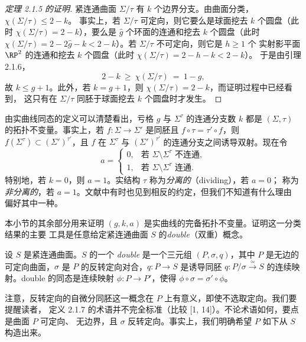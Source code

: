 \begin{proof}[定理 2.1.5 的证明]
紧连通曲面 $\Sigma/\tau$ 有 $k$ 个边界分支。由曲面分类，$\chi(\Sigma/\tau)\le2-k$。
事实上，若 $\Sigma/\tau$ 可定向，则它要么是球面挖去 $k$ 个圆盘（此时
$\chi(\Sigma/\tau)=2-k$），要么是 $\hat g$ 个环面的连通和挖去 $k$ 个圆盘（此时
$\chi(\Sigma/\tau)=2-2\hat g-k<2-k$）。若 $\Sigma/\tau$ 不可定向，则它是 $h\ge1$ 个
实射影平面 $\RP^2$ 的连通和挖去 $k$ 个圆盘（此时 $\chi(\Sigma/\tau)=2-h-k<2-k$）。
于是由引理 2.1.6，
\[
2-k\ \ge\ \chi(\Sigma/\tau)\ =\ 1-g,
\]
故 $k\le g+1$。此外，若 $k=g+1$，则 $\chi(\Sigma/\tau)=2-k$，而证明过程中已经看到，
这只有在 $\Sigma/\tau$ 同胚于球面挖去 $k$ 个圆盘时才发生。
\end{proof}

由实曲线同态的定义可以清楚看出，亏格 $g$ 与 $\Sigma^\tau$ 的连通分支数 $k$ 都是
$(\Sigma,\tau)$ 的拓扑不变量。事实上，若 $f:\Sigma\to\Sigma'$ 是同胚且
$f\circ\tau=\tau'\circ f$，则 $f(\Sigma^\tau)\subset(\Sigma')^{\tau'}$，且 $f$ 在
$\Sigma^\tau$ 与 $(\Sigma')^{\tau'}$ 的连通分支之间诱导双射。现在令
\begin{equation}\label{eq:2.4}
a=
\begin{cases}
0, & \text{若 } \Sigma\setminus\Sigma^\tau \text{ 不连通},\\
1, & \text{若 } \Sigma\setminus\Sigma^\tau \text{ 连通}.
\end{cases}
\end{equation}
特别地，若 $k=0$，则 $a=1$。实结构 $\tau$ 称为\emph{分离的}（dividing），若 $a=0$；
称为\emph{非分离的}，若 $a=1$。文献中有时也见到相反的约定，但我们不知道有什么理由
偏好其中一种。

本小节的其余部分用来证明 $(g,k,a)$ 是实曲线的完备拓扑不变量。证明这一分类结果的主要
工具是任意给定紧连通曲面 $S$ 的\emph{double}（双重）概念。

\begin{definition}\label{def:2.1.7}
设 $S$ 是紧连通曲面。$S$ 的一个 \emph{double} 是一个三元组 $(P,\sigma,q)$，其中 $P$
是无边的可定向曲面，$\sigma$ 是 $P$ 的反转定向对合，$q:P\to S$ 是诱导同胚
$q:P/\sigma\xrightarrow{\ \simeq\ }S$ 的连续映射。double 的同态是连续映射
$\phi:P\to P'$，使得 $\phi\circ\sigma=\sigma'\circ\phi$。
\end{definition}

注意，反转定向的自微分同胚这一概念在 $P$ 上有意义，即使不选取定向。我们要提醒读者，
定义 2.1.7 的术语并不完全标准（比较 [1, 14]）。不论术语如何，要点是曲面 $P$ 可定向、
无边界，且 $\sigma$ 反转定向。事实上，我们明确希望 $P$ 如下从 $S$ 构造出来。

